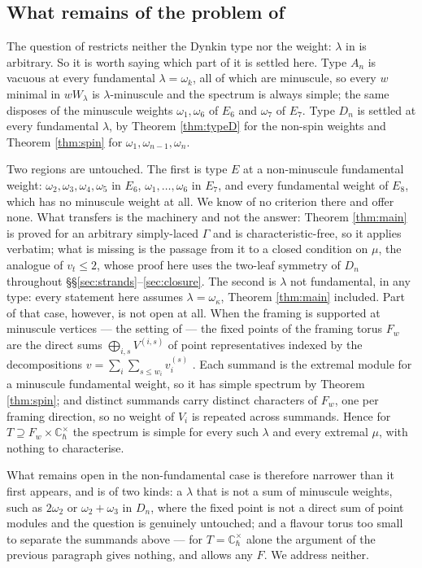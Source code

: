 \documentclass[reqno]{amsart}
\theoremstyle{plain}
\theoremstyle{definition}
\newcommand{\la}{\lambda}
\newcommand{\om}{\omega}
\newcommand{\ka}{\kappa}
\begin{document}
\subsection{What remains of the problem of \texorpdfstring{\cite[\S5.4.2]{DKK}}{[DKK, 5.4.2]}}
\label{ss:remains}
The question of \cite[\S5.4.2]{DKK} restricts neither the Dynkin type nor the
weight: $\la$ in \cite[Def.~5.1]{DKK} is arbitrary.  So it is worth saying
which part of it is settled here.  Type $A_n$ is vacuous at every fundamental
$\la=\om_k$, all of which are minuscule, so every $w$ minimal in $wW_\la$ is
$\la$-minuscule \cite[\S2]{Stem} and the spectrum is always simple; the same
disposes of the minuscule weights $\om_1,\om_6$ of $E_6$ and $\om_7$ of $E_7$.
Type $D_n$ is settled at every fundamental $\la$, by Theorem \ref{thm:typeD}
for the non-spin weights and Theorem \ref{thm:spin} for $\om_1,\om_{n-1},
\om_n$.

Two regions are untouched.  The first is type $E$ at a non-minuscule
fundamental weight: $\om_2,\om_3,\om_4,\om_5$ in $E_6$, $\om_1,\dots,\om_6$ in
$E_7$, and every fundamental weight of $E_8$, which has no minuscule weight at
all.  We know of no criterion there and offer none.  What transfers is the
machinery and not the answer: Theorem \ref{thm:main} is proved for an arbitrary
simply-laced $\Gamma$ and is characteristic-free, so it applies verbatim; what
is missing is the passage from it to a closed condition on $\mu$, the analogue
of $v_t\le2$, whose proof here uses the two-leaf symmetry of $D_n$ throughout
\S\S\ref{sec:strands}--\ref{sec:closure}.  The second is $\la$ not
fundamental, in any type: every statement here assumes $\la=\om_\ka$, Theorem
\ref{thm:main} included.  Part of that case, however, is not open at all.  When
the framing is supported at minuscule vertices --- the setting of
\cite[Thm.~B]{DKK} --- the fixed points of the framing torus $F_w$ are the
direct sums $\bigoplus_{i,s}V^{(i,s)}$ of point representatives indexed by the
decompositions $v=\sum_i\sum_{s\le w_i}v_i^{(s)}$ \cite[Ex.~4.29]{DKK}.  Each
summand is the extremal module for a minuscule fundamental weight, so it has
simple spectrum by Theorem \ref{thm:spin}; and distinct summands carry distinct
characters of $F_w$, one per framing direction, so no weight of $V_i$ is
repeated across summands.  Hence for $T\supseteq F_w\times\mathbb{C}^\times_\hbar$
the spectrum is simple for every such $\la$ and every extremal $\mu$, with
nothing to characterise.

What remains open in the non-fundamental case is therefore narrower than it
first appears, and is of two kinds: a $\la$ that is not a sum of minuscule
weights, such as $2\om_2$ or $\om_2+\om_3$ in $D_n$, where the fixed point is
not a direct sum of point modules and the question is genuinely untouched; and
a flavour torus too small to separate the summands above --- for
$T=\mathbb{C}^\times_\hbar$ alone the argument of the previous paragraph gives
nothing, and \cite[\S5.4.2]{DKK} allows any $F$.  We address neither.
\end{document}
